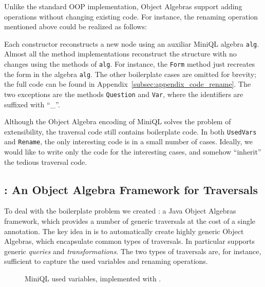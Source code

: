 Unlike the standard OOP implementation,
Object Algebras support adding operations without changing existing code.
For instance, the renaming operation mentioned above could be realized
as follows:


Each
constructor reconstructs a new node using an auxiliar MiniQL algebra \lstinline{alg}.
Almost all the method implementations reconstruct the structure with
no changes using the methods of \lstinline{alg}. For instance, the \lstinline{Form} method just recreates the form in the algebra \lstinline{alg}. The other boilerplate cases are omitted for brevity; the full code can be found in
  Appendix~\ref{subsec:appendix_code_rename}. The two exceptions are the
methods \lstinline{Question} and \lstinline{Var}, where the identifiers are suffixed with ``\_''.

Although the Object Algebra encoding of MiniQL solves the problem of extensibility, the traversal code still contains boilerplate code.
In both \lstinline{UsedVars} and \lstinline{Rename}, the only interesting code
is in a small number of cases.  Ideally, we would like to write only
the code for the interesting cases, and somehow ``inherit'' the
tedious traversal code.

\subsection{\Name: An Object Algebra Framework for Traversals}

To deal with the boilerplate problem we created \Name: a Java Object
Algebras framework, which provides a number of generic traversals at
the cost of a single annotation. The key idea in \name is to
automatically create highly generic Object Algebras, which encapsulate
common types of traversals. In particular \name supports generic
\emph{queries} and \emph{transformations}. The two types of
traversals are, for instance,  sufficient to capture the used variables and
renaming operations.

\begin{figure}[t]
\nocaptionrule
\caption{MiniQL used variables, implemented with \Name.}
\label{usedvars_with_oaframework}
\end{figure}

